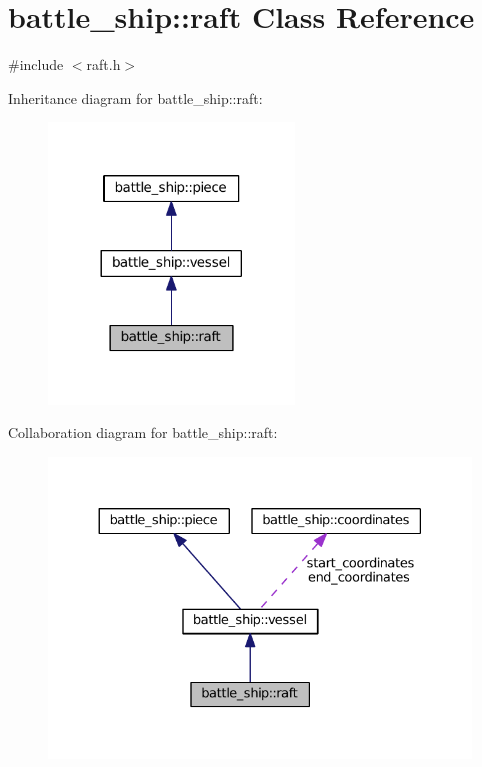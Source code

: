 \hypertarget{classbattle__ship_1_1raft}{}\section{battle\+\_\+ship\+:\+:raft Class Reference}
\label{classbattle__ship_1_1raft}


{\ttfamily \#include $<$raft.\+h$>$}



Inheritance diagram for battle\+\_\+ship\+:\+:raft\+:
\nopagebreak
\begin{figure}[H]
\begin{center}
\leavevmode
\includegraphics[width=185pt]{classbattle__ship_1_1raft__inherit__graph}
\end{center}
\end{figure}


Collaboration diagram for battle\+\_\+ship\+:\+:raft\+:
\nopagebreak
\begin{figure}[H]
\begin{center}
\leavevmode
\includegraphics[width=330pt]{classbattle__ship_1_1raft__coll__graph}
\end{center}
\end{figure}
